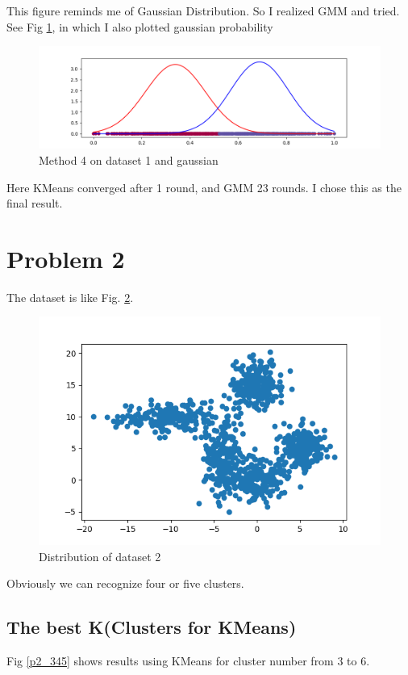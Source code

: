 \documentclass[conference]{IEEEtran}
\begin{document}
This figure reminds me of Gaussian Distribution. So I realized GMM and tried. See Fig \ref{m4p1gaussian}, in which I also plotted gaussian probability
\begin{figure}[htbp]
	\centerline{\includegraphics[scale=0.375]{m4p1gaussian.png}}
	\caption{Method 4 on dataset 1 and gaussian}
	\label{m4p1gaussian}
\end{figure}

Here KMeans converged after 1 round, and GMM 23 rounds. I chose this as the final result.
\section{\textbf{Problem 2}}
The dataset is like Fig. \ref{p2raw}.

\begin{figure}[htbp]
	\centerline{\includegraphics[scale=0.5]{p2raw.png}}
	\caption{Distribution of dataset 2}
	\label{p2raw}
\end{figure}

Obviously we can recognize four or five clusters.

\subsection{The best K(Clusters for KMeans)}
Fig \ref{p2_345} shows results using KMeans for cluster number from 3 to 6.
\end{document}
